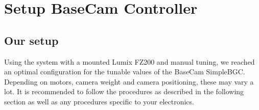 \chapter{Setup BaseCam Controller}


\section{Our setup}
Using the system with a mounted Lumix FZ200 and manual tuning, we reached an optimal configuration for the tunable values of the BaseCam SimpleBGC. Depending on motors, camera weight and camera positioning, these may vary a lot. It is recommended to follow the procedures as described in the following section as well as any procedures specific to your electronics.

